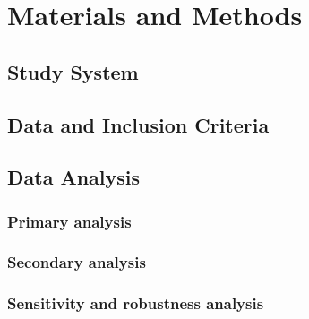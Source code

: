 \section{Materials and Methods}
\label{sec:study1-methods}

\subsection{Study System}
\label{subsec:study1-system}
\mbox{}\par

\subsection{Data and Inclusion Criteria}
\label{subsec:study1-data}
\mbox{}\par

\subsection{Data Analysis}
\label{subsec:study1-analysis}

\subsubsection{Primary analysis}
\mbox{}\par

\subsubsection{Secondary analysis}
\mbox{}\par

\subsubsection{Sensitivity and robustness analysis}
\mbox{}\par

